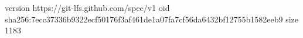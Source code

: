 version https://git-lfs.github.com/spec/v1
oid sha256:7ecc37336b9322ecf50176f3af461de1a07fa7cf56da6432bf12755b1582eeb9
size 1183
